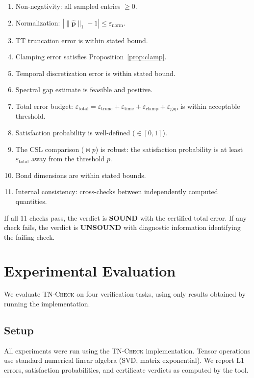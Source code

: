 \documentclass[11pt]{article}
\newcommand{\tncheck}{\textsc{TN-Check}}
\newcommand{\norm}[1]{\lVert #1 \rVert}
\newcommand{\eps}{\varepsilon}
\begin{document}
\begin{enumerate}[itemsep=1pt,label=C\arabic*.]
\item Non-negativity: all sampled entries $\geq 0$.
\item Normalization: $|\norm{\hat{\mathbf{p}}}_1 - 1| \leq \eps_{\mathrm{norm}}$.
\item TT truncation error is within stated bound.
\item Clamping error satisfies Proposition~\ref{prop:clamp}.
\item Temporal discretization error is within stated bound.
\item Spectral gap estimate is feasible and positive.
\item Total error budget: $\eps_{\mathrm{total}} = \eps_{\mathrm{trunc}} +
  \eps_{\mathrm{time}} + \eps_{\mathrm{clamp}} + \eps_{\mathrm{gap}}$
  is within acceptable threshold.
\item Satisfaction probability is well-defined ($\in [0,1]$).
\item The CSL comparison ($\bowtie p$) is robust:
  the satisfaction probability is at least $\eps_{\mathrm{total}}$
  away from the threshold $p$.
\item Bond dimensions are within stated bounds.
\item Internal consistency: cross-checks between independently
  computed quantities.
\end{enumerate}

If all 11 checks pass, the verdict is \textbf{SOUND} with the
certified total error.
If any check fails, the verdict is \textbf{UNSOUND} with
diagnostic information identifying the failing check.

\section{Experimental Evaluation}\label{sec:experiments}

We evaluate \tncheck{} on four verification tasks, using only
results obtained by running the implementation.

\subsection{Setup}\label{sec:exp:setup}

All experiments were run using the \tncheck{} implementation.
Tensor operations use standard numerical linear algebra
(SVD, matrix exponential).
We report L1 errors, satisfaction probabilities, and certificate
verdicts as computed by the tool.
\end{document}

